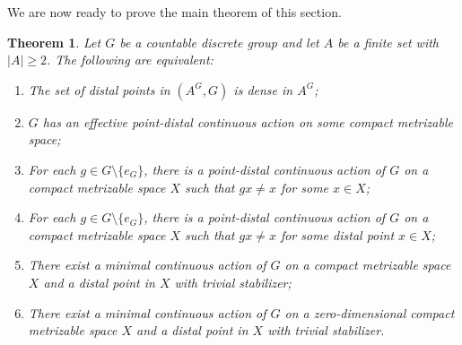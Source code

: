 \documentclass[11pt]{amsart}
\newtheorem{theorem}{Theorem}[section]
\theoremstyle{definition}
\numberwithin{equation}{section}
\theoremstyle{definition}
\begin{document}
We are now ready to prove the main theorem of this section.

\begin{theorem} \label{P-effective point-distal}
Let $G$ be  a countable discrete group and let $A$ be a finite set with $|A|\ge 2$. The following are equivalent:
\begin{enumerate}
\item The set of distal points in $(A^G,G)$ is dense in $A^G$;
\item $G$ has an effective point-distal continuous action on some compact metrizable space;
\item For each $g\in G\setminus \{e_G\}$, there is a point-distal continuous action of $G$ on a compact metrizable space $X$ such that 
           $gx\neq x$ for some $x\in X$;
\item For each $g\in G\setminus \{e_G\}$, there is  a point-distal continuous  action of $G$ on a compact metrizable space $X$ such that $gx\neq x$ for some distal point $x\in X$;
\item    There exist a minimal continuous action of $G$ on a compact metrizable space $X$ and  a distal point in $X$ with trivial stabilizer;
\item    There exist a minimal continuous action of $G$ on a zero-dimensional compact metrizable space $X$ and  a distal point in $X$ with trivial stabilizer.
\end{enumerate}
\end{theorem}
\end{document}

